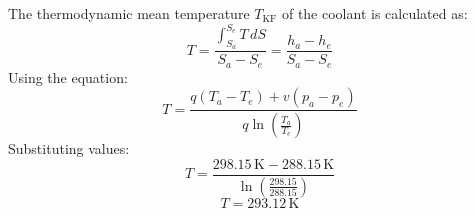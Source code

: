 The thermodynamic mean temperature \( T_{\text{KF}} \) of the coolant is calculated as:  
\[
T = \frac{\int_{S_a}^{S_e} T \, dS}{S_a - S_e} = \frac{h_a - h_e}{S_a - S_e}
\]  
Using the equation:  
\[
T = \frac{q (T_a - T_e) + v (p_a - p_e)}{q \ln \left( \frac{T_a}{T_e} \right)}
\]  
Substituting values:  
\[
T = \frac{298.15 \, \text{K} - 288.15 \, \text{K}}{\ln \left( \frac{298.15}{288.15} \right)}
\]  
\[
T = 293.12 \, \text{K}
\]